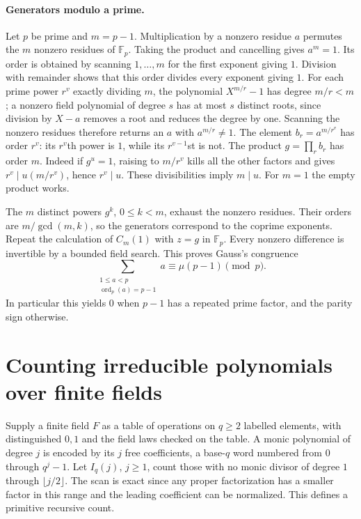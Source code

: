 \paragraph{Generators modulo a prime.}
Let $p$ be prime and $m=p-1$. Multiplication by a nonzero residue $a$
permutes the $m$ nonzero residues of $\mathbb F_p$. Taking the product
and cancelling gives $a^m=1$. Its order is obtained by scanning
$1,\ldots,m$ for the first exponent giving $1$. Division with remainder
shows that this order divides every exponent giving $1$.
For each prime power $r^v$ exactly dividing $m$, the polynomial
$X^{m/r}-1$ has degree $m/r<m$; a nonzero field polynomial of degree $s$
has at most $s$ distinct roots, since division by $X-a$ removes a root
and reduces the degree by one. Scanning the nonzero residues therefore
returns an $a$ with $a^{m/r}\ne1$. The element $b_r=a^{m/r^v}$
has order $r^v$: its $r^v$th power is $1$, while its $r^{v-1}$st is
not. The product $g=\prod_r b_r$ has order $m$. Indeed if $g^u=1$,
raising to $m/r^v$ kills all the other factors and gives
$r^v\mid u(m/r^v)$, hence $r^v\mid u$. These divisibilities imply
$m\mid u$. For $m=1$ the empty product works.

The $m$ distinct powers $g^k$, $0\le k<m$, exhaust the nonzero
residues. Their orders are $m/\gcd(m,k)$, so the generators correspond
to the coprime exponents. Repeat the calculation of $C_m(1)$ with
$z=g$ in $\mathbb F_p$. Every nonzero difference is invertible by a
bounded field search. This proves Gauss's congruence
\[
  \sum_{\substack{1\le a<p\\ \operatorname{ord}_p(a)=p-1}} a
        \equiv \mu(p-1)\pmod p .
\]
In particular this yields $0$ when $p-1$ has a repeated prime factor,
and the parity sign otherwise.

\section{Counting irreducible polynomials over finite fields}
\label{sec:irreducibles}

Supply a finite field $F$ as a table of operations on $q\ge2$ labelled
elements, with distinguished $0,1$ and the field laws checked on the
table. A monic polynomial of degree $j$ is encoded by its $j$ free
coefficients, a base-$q$ word numbered from $0$ through $q^j-1$.
Let $I_q(j)$, $j\ge1$, count those with no monic divisor of degree $1$ through
$\lfloor j/2\rfloor$. The scan is exact since any proper factorization
has a smaller factor in this range and the leading coefficient can be
normalized. This defines a primitive recursive count.

